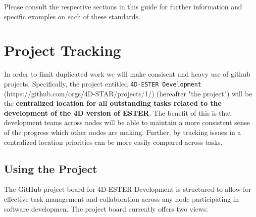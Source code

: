 \documentclass{ol-softwaremanual}
\begin{document}
Please consult the respective sections in this guide for further information and specific examples on each of these standards.


\section{Project Tracking}
In order to limit duplicated work we will make consisent and heavy use of github
projects. Specifically, the project entitled \texttt{4D-ESTER Development}
(https://github.com/orgs/4D-STAR/projects/1/) (hereafter "the project") will be the \textbf{centralized
location for all outstanding tasks related to the development of the 4D version
of ESTER}. The benefit of this is that development teams across nodes will be able
to maintain a more consistent sense of the progress which other nodes are making.
Further, by tracking issues in a centralized location priorities can be more easily compared
across tasks. 

\subsection{Using the Project}
The GitHub project board for 4D-ESTER Development is structured to allow for effective task management and collaboration across any node participating in software developmen. The project board currently offers two views:
\end{document}
